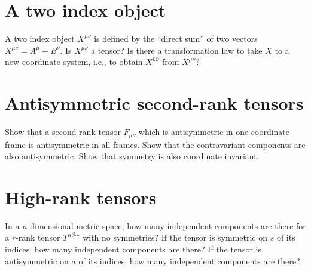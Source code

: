 \documentclass[a4paper, 11pt, oneside]{impression}
\begin{document}


\newpage

\chapter{A two index object}\label{quest: thirteen}

\begin{exercise}{}
    A two index object $X^{\mu\nu}$ is defined by the ``direct sum'' of two vectors $X^{\mu\nu} = A^{\mu} + B^{\nu}$. Is $X^{\mu\nu}$ a tensor? Is there a transformation law to take $X$ to a new coordinate system, i.e., to obtain $X^{\hat{\mu}\hat{\nu}}$ from $X^{\mu\nu}$?
\end{exercise}



\newpage

\chapter{Antisymmetric second-rank tensors}\label{quest: fourteen}

\begin{exercise}{}
    Show that a second-rank tensor $F_{\mu\nu}$ which is antisymmetric in one coordinate frame is antisymmetric in all frames. Show that the contravariant components are also antisymmetric. Show that symmetry is also coordinate invariant.
\end{exercise}



\newpage

\chapter{High-rank tensors}\label{quest: fiftheen}

\begin{exercise}{}
    In a $n$-dimensional metric space, how many independent components are there for a $r$-rank tensor $T^{\alpha\beta\cdots}$ with no symmetries? If the tensor is symmetric on $s$ of its indices, how many independent components are there? If the tensor is antisymmetric on $a$ of its indices, how many independent components are there?
\end{exercise}



\newpage
\end{document}
